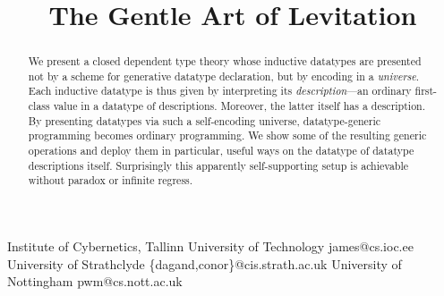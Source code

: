 \documentclass[preprint
              , authoryear
              ]{sigplanconf}
\begin{document}
\ColourEpigram







\title{The Gentle Art of Levitation}


           {Institute of Cybernetics, Tallinn University of Technology}
           {james@cs.ioc.ee}
           {University of Strathclyde}
           {\{dagand,conor\}@cis.strath.ac.uk}
           {University of Nottingham}
           {pwm@cs.nott.ac.uk}


\maketitle




\begin{abstract}
  We present a closed dependent type theory whose inductive datatypes
  are presented not by a scheme for generative datatype declaration,
  but by encoding in a \emph{universe}. Each inductive datatype is
  thus given by interpreting its \emph{description}---an ordinary
  first-class value in a datatype of descriptions. Moreover, the
  latter itself has a description. By presenting datatypes via such a
  self-encoding universe, datatype-generic programming becomes
  ordinary programming. We show some of the resulting generic
  operations and deploy them in particular, useful ways on the
  datatype of datatype descriptions itself. Surprisingly this
  apparently self-supporting setup is achievable without paradox or
  infinite regress.
\end{abstract}


\end{document}
